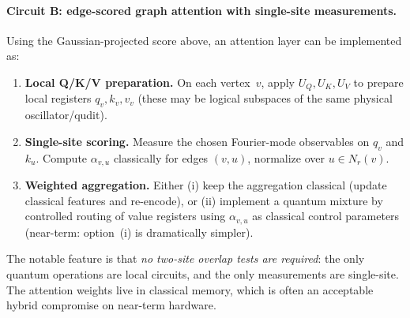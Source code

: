 \documentclass[11pt,oneside]{amsbook}
\numberwithin{equation}{section}
\theoremstyle{plain}
\theoremstyle{definition}
\theoremstyle{remark}
\begin{document}
\paragraph{Circuit B: edge-scored graph attention with single-site measurements.}
Using the Gaussian-projected score above, an attention layer can be implemented as:
\begin{enumerate}
\item \textbf{Local Q/K/V preparation.} On each vertex~$v$, apply $U_Q,U_K,U_V$ to prepare local registers
$q_v,k_v,v_v$ (these may be logical subspaces of the same physical oscillator/qudit).
\item \textbf{Single-site scoring.} Measure the chosen Fourier-mode observables on $q_v$ and $k_u$.
Compute $\alpha_{v,u}$ classically for edges $(v,u)$, normalize over $u\in N_r(v)$.
\item \textbf{Weighted aggregation.} Either (i) keep the aggregation classical (update classical features and
re-encode), or (ii) implement a quantum mixture by controlled routing of value registers using $\alpha_{v,u}$ as
classical control parameters (near-term: option~(i) is dramatically simpler).
\end{enumerate}
The notable feature is that \emph{no two-site overlap tests are required}: the only quantum operations are local
circuits, and the only measurements are single-site. The attention weights live in classical memory, which is
often an acceptable hybrid compromise on near-term hardware.
\end{document}
